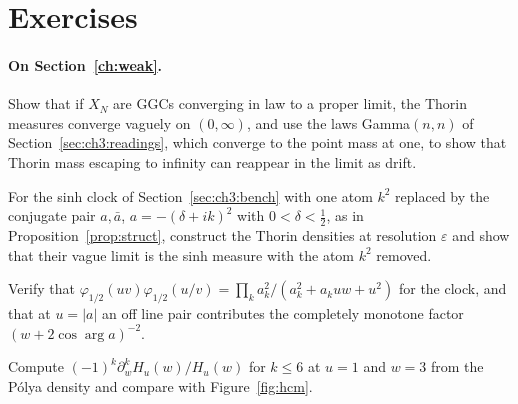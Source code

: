 \section{Exercises}\label{chap:hcm:ex}

\paragraph{On Section~\ref{ch:weak}.}
\begin{exercises}
\item Show that if $X_N$ are GGCs converging in law to a proper limit, the Thorin measures converge vaguely on $(0,\infty)$, and use the laws Gamma$(n,n)$ of Section~\ref{sec:ch3:readings}, which converge to the point mass at one, to show that Thorin mass escaping to infinity can reappear in the limit as drift.
\item For the sinh clock of Section~\ref{sec:ch3:bench} with one atom $k^2$ replaced by the conjugate pair $a,\bar a$, $a=-(\delta+ik)^2$ with $0<\delta<\frac12$, as in Proposition~\ref{prop:struct}, construct the Thorin densities at resolution $\varepsilon$ and show that their vague limit is the sinh measure with the atom $k^2$ removed.
\item Verify that $\varphi_{1/2}(uv)\varphi_{1/2}(u/v)=\prod_ka_k^2/(a_k^2+a_kuw+u^2)$ for the clock, and that at $u=|a|$ an off line pair contributes the completely monotone factor $(w+2\cos\arg a)^{-2}$.
\item Compute $(-1)^k\partial_w^kH_u(w)/H_u(w)$ for $k\le6$ at $u=1$ and $w=3$ from the P\'olya density and compare with Figure~\ref{fig:hcm}.
\end{exercises}
